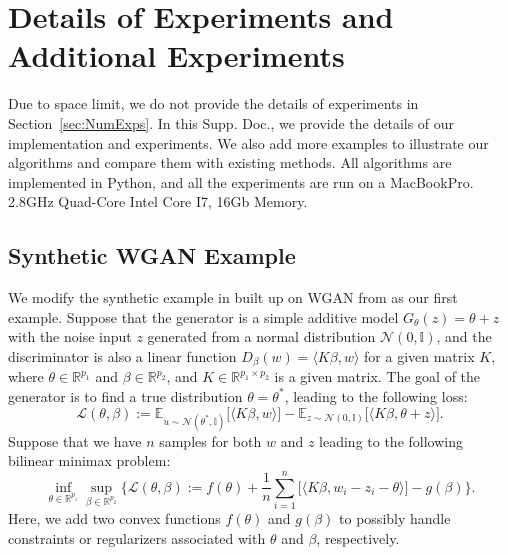 \documentclass{article}
\newcommand{\R}{\mathbb{R}}
\newcommand{\Id}{\mathbb{I}}
\newcommand{\iprods}[1]{\langle #1\rangle}
\newcommand{\Lc}{\mathcal{L}}
\newcommand{\Nc}{\mathcal{N}}
\newcommand{\beforesec}{\vspace{-1.5ex}}
\newcommand{\aftersec}{\vspace{-1.25ex}}
\newcommand{\beforesubsec}{\vspace{-1.5ex}}
\newcommand{\aftersubsec}{\vspace{-1.5ex}}
\theoremstyle{plain}
\theoremstyle{definition}
\theoremstyle{remark}
\begin{document}
\beforesec
\section{Details of Experiments and Additional Experiments}\label{apdx:sec:num_experiments}
\aftersec
Due to space limit, we do not provide the details of experiments in Section~\ref{sec:NumExps}.
In this Supp. Doc., we provide the details of our implementation and experiments.
We also add more examples to illustrate our algorithms and compare them with existing methods.
All algorithms are implemented in Python, and all the experiments are run on a MacBookPro. 2.8GHz Quad-Core Intel Core I7, 16Gb Memory.

\beforesubsec
\subsection{Synthetic WGAN Example}\label{apdx:subsec:detail_numexps}
\aftersubsec
We modify the synthetic example in \citep{daskalakis2018training} built up on WGAN from \citep{arjovsky2017wasserstein} as our first example. 
Suppose that the generator is a simple additive model $G_{\theta}(z) =  \theta + z$ with the noise input $z$ generated from a normal distribution $\Nc(0, \Id)$, and the discriminator is also a linear function $D_{\beta}(w) = \iprods{K\beta, w}$ for a given matrix $K$, where $\theta \in \R^{p_1}$ and $\beta \in \R^{p_2}$, and $K \in \R^{p_1\times p_2}$ is a given matrix.
The goal of the generator is to find a true distribution $\theta = \theta^{*}$, leading to the following loss:
\begin{equation*}
\Lc(\theta, \beta) := \mathbb{E}_{u \sim \Nc(\theta^{*}, \Id)}\big[ \iprods{K\beta, w} \big] - \mathbb{E}_{z \sim \Nc(0, \Id)}\big[ \iprods{K\beta, \theta + z} \big].
\end{equation*}
Suppose that we have $n$ samples for both $w$ and $z$ leading to the following bilinear minimax problem:
\begin{equation}\label{eq:syn_WGAN_sup}
{\inf_{\theta \in\R^{p_1}} \sup_{\beta\in \R^{p_2}}} \big\{ \Lc(\theta, \beta) := f(\theta) + \frac{1}{n}\sum_{i=1}^n \big[ \iprods{K\beta, w_i - z_i - \theta} \big] - g(\beta) \big\}.
\end{equation}
Here, we add two convex functions $f(\theta)$ and $g(\beta)$ to possibly handle constraints or regularizers associated with $\theta$ and $\beta$, respectively.
\end{document}

